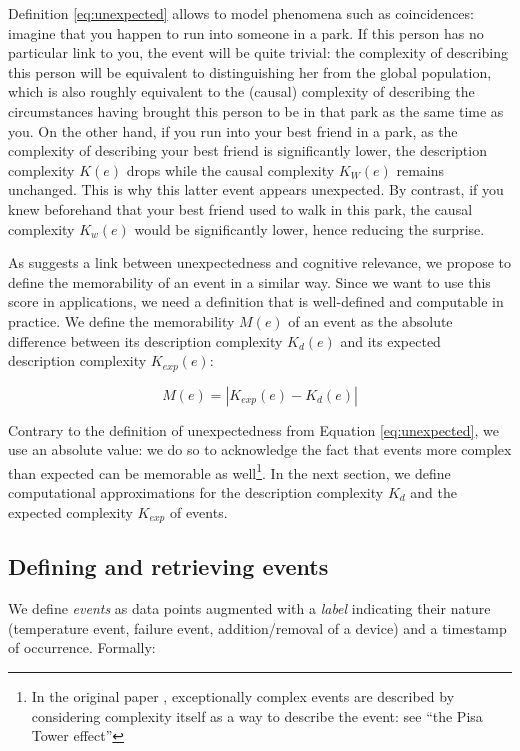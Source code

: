 \documentclass[entropy,article,submit,moreauthors,pdftex]{Definitions/mdpi}
\begin{document}
Definition \ref{eq:unexpected} allows to model phenomena
such as coincidences: imagine that you happen to run into someone in a park.
If this person has no particular link to you, the event will be quite
trivial: the complexity of describing this person will be equivalent to
distinguishing her from the global population, which is also roughly
equivalent to the (causal) complexity of describing the circumstances having brought this person to be in
that park as the same time as you. On the other hand, if you run into your best friend in
a park, as the complexity of describing your best friend is significantly
lower, the description complexity $K(e)$ drops while the causal complexity
$K_W (e)$ remains unchanged. This is why this latter  event appears unexpected. By contrast, if you knew beforehand that your best friend used to walk in this park, the causal complexity $K_w(e)$ would be significantly lower, hence reducing the surprise.

As \cite{dessalles2011coincidences} suggests a link between unexpectedness and cognitive relevance, we propose to define the memorability of an event in a similar way. Since we want to use this score in applications, we need a definition that is well-defined and computable in practice.
We define the memorability $M(e)$ of an event as the absolute difference between its description complexity $K_d(e)$ and its expected description complexity $K_{exp}(e)$:

\begin{equation}
    \label{eq:memorability}
    M(e) = |K_{exp}(e) - K_d(e)|
\end{equation}

Contrary to the definition of unexpectedness from Equation \ref{eq:unexpected}, we use an absolute value: we do so to acknowledge the fact that events more complex than expected can be memorable as well\footnote{In the original paper \cite{dessalles2011coincidences}, exceptionally complex events are described by considering complexity itself as a way to describe the event: see ``the Pisa Tower effect''\cite{dessalles_pisa_nodate}}. In the next section, we define computational approximations for the description complexity $K_d$ and the expected complexity $K_{exp}$ of events.

\subsection{Defining and retrieving events}
\label{sec:computing}

We define \emph{events} as data points augmented with a \emph{label} indicating their nature (temperature event, failure event, addition/removal of a device) and a timestamp of occurrence. Formally:
\end{document}
